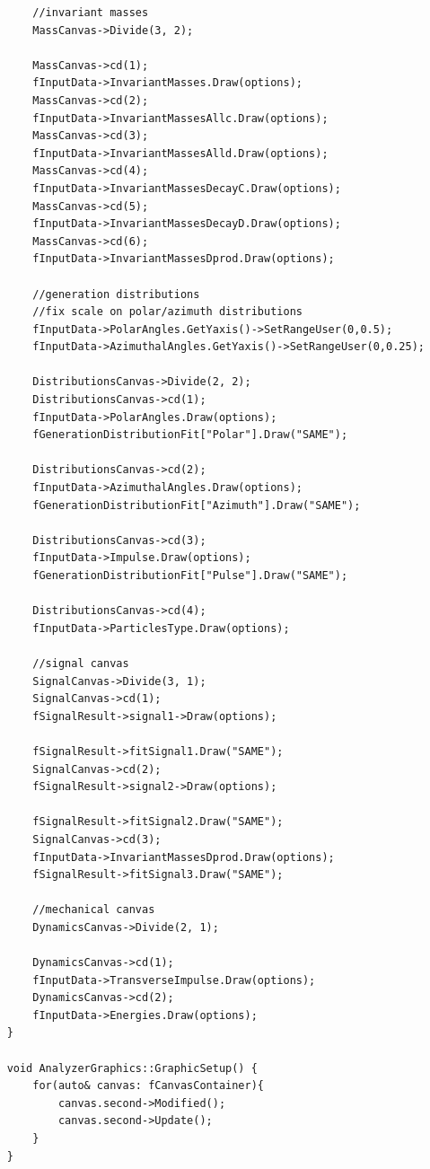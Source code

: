 \documentclass[12pt, a4paper]{article}
\begin{document}
\begin{verbatim}
        //invariant masses
        MassCanvas->Divide(3, 2);

        MassCanvas->cd(1);
        fInputData->InvariantMasses.Draw(options);
        MassCanvas->cd(2);
        fInputData->InvariantMassesAllc.Draw(options);
        MassCanvas->cd(3);
        fInputData->InvariantMassesAlld.Draw(options);
        MassCanvas->cd(4);
        fInputData->InvariantMassesDecayC.Draw(options);
        MassCanvas->cd(5);
        fInputData->InvariantMassesDecayD.Draw(options);
        MassCanvas->cd(6);
        fInputData->InvariantMassesDprod.Draw(options);

        //generation distributions
        //fix scale on polar/azimuth distributions
        fInputData->PolarAngles.GetYaxis()->SetRangeUser(0,0.5);
        fInputData->AzimuthalAngles.GetYaxis()->SetRangeUser(0,0.25);

        DistributionsCanvas->Divide(2, 2);
        DistributionsCanvas->cd(1);
        fInputData->PolarAngles.Draw(options);
        fGenerationDistributionFit["Polar"].Draw("SAME");

        DistributionsCanvas->cd(2);
        fInputData->AzimuthalAngles.Draw(options);
        fGenerationDistributionFit["Azimuth"].Draw("SAME");

        DistributionsCanvas->cd(3);
        fInputData->Impulse.Draw(options);
        fGenerationDistributionFit["Pulse"].Draw("SAME");

        DistributionsCanvas->cd(4);
        fInputData->ParticlesType.Draw(options);

        //signal canvas
        SignalCanvas->Divide(3, 1);
        SignalCanvas->cd(1);
        fSignalResult->signal1->Draw(options);

        fSignalResult->fitSignal1.Draw("SAME");
        SignalCanvas->cd(2);
        fSignalResult->signal2->Draw(options);

        fSignalResult->fitSignal2.Draw("SAME");
        SignalCanvas->cd(3);
        fInputData->InvariantMassesDprod.Draw(options);
        fSignalResult->fitSignal3.Draw("SAME");

        //mechanical canvas
        DynamicsCanvas->Divide(2, 1);

        DynamicsCanvas->cd(1);
        fInputData->TransverseImpulse.Draw(options);
        DynamicsCanvas->cd(2);
        fInputData->Energies.Draw(options);
    }

    void AnalyzerGraphics::GraphicSetup() {
        for(auto& canvas: fCanvasContainer){
            canvas.second->Modified();
            canvas.second->Update();
        }
    }


\end{verbatim}
\end{document}
